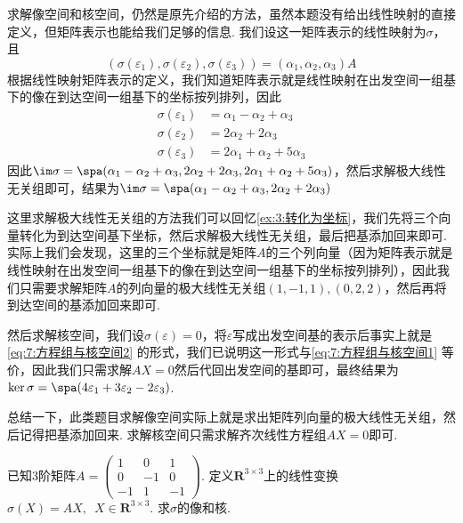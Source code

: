 \begin{solution}
    求解像空间和核空间，仍然是原先介绍的方法，虽然本题没有给出线性映射的直接定义，但矩阵表示也能给我们足够的信息. 我们设这一矩阵表示的线性映射为$\sigma$，且
    \[(\sigma(\varepsilon_1),\sigma(\varepsilon_2),\sigma(\varepsilon_3))=(\alpha_1,\alpha_2,\alpha_3)A\]
    根据线性映射矩阵表示的定义，我们知道矩阵表示就是线性映射在出发空间一组基下的像在到达空间一组基下的坐标按列排列，因此
    \begin{align*}
        \sigma(\varepsilon_1) & =\alpha_1-\alpha_2+\alpha_3   \\
        \sigma(\varepsilon_2) & =2\alpha_2+2\alpha_3          \\
        \sigma(\varepsilon_3) & =2\alpha_1+\alpha_2+5\alpha_3
    \end{align*}
    因此$\im\sigma=\spa(\alpha_1-\alpha_2+\alpha_3,2\alpha_2+2\alpha_3,2\alpha_1+\alpha_2+5\alpha_3)$，然后求解极大线性无关组即可，结果为$\im\sigma=\spa(\alpha_1-\alpha_2+\alpha_3,2\alpha_2+2\alpha_3)$

    这里求解极大线性无关组的方法我们可以回忆\autoref{ex:3:转化为坐标}，我们先将三个向量转化为到达空间基下坐标，然后求解极大线性无关组，最后把基添加回来即可. 实际上我们会发现，这里的三个坐标就是矩阵$A$的三个列向量（因为矩阵表示就是线性映射在出发空间一组基下的像在到达空间一组基下的坐标按列排列），因此我们只需要求解矩阵$A$的列向量的极大线性无关组$(1,-1,1),(0,2,2)$，然后再将到达空间的基添加回来即可.

    然后求解核空间，我们设$\sigma(\varepsilon)=0$，将$\varepsilon$写成出发空间基的表示后事实上就是\autoref{eq:7:方程组与核空间2} 的形式，我们已说明这一形式与\autoref{eq:7:方程组与核空间1} 等价，因此我们只需求解$AX=0$然后代回出发空间的基即可，最终结果为$\ker\sigma=\spa(4\varepsilon_1+3\varepsilon_2-2\varepsilon_3)$.
\end{solution}

总结一下，此类题目求解像空间实际上就是求出矩阵列向量的极大线性无关组，然后记得把基添加回来. 求解核空间只需求解齐次线性方程组$AX=0$即可.

\begin{example}\label{ex:7:矩阵表示3}
    已知3阶矩阵$A=\begin{pmatrix}
            1 & 0 & 1 \\ 0 & -1 & 0 \\ -1 & 1 & -1
        \end{pmatrix}$. 定义$\mathbf{R}^{3 \times 3}$上的线性变换$\sigma(X)=AX,\enspace X \in \mathbf{R}^{3 \times 3}$. 求$\sigma$的像和核.
\end{example}

